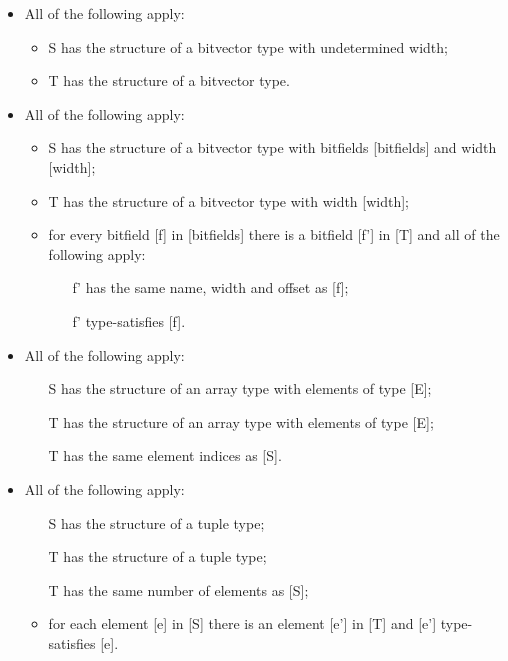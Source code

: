 \documentclass{book}
\begin{document}
\begin{itemize}
  \item  All of the following apply:
    \begin{itemize}
    \item  S has the structure of a bitvector type with undetermined width;
    \item  T has the structure of a bitvector type. 
    \end{itemize}

  \item  All of the following apply:
    \begin{itemize}
    \item  S has the structure of a bitvector type with bitfields [bitfields] and width [width];
    \item  T has the structure of a bitvector type with width [width];
    \item  for every bitfield [f] in [bitfields] there is a bitfield [f'] in [T] and
      all of the following apply:
      \begin{itemize}
      \item  [f'] has the same name, width and offset as [f];
      \item  [f'] type-satisfies [f].
      \end{itemize}
    \end{itemize}

  \item  All of the following apply:
    \begin{itemize}
    \item  [S] has the structure of an array type with elements of type [E];
    \item  [T] has the structure of an array type with elements of type [E];
    \item  [T] has the same element indices as [S].
    \end{itemize}

  \item  All of the following apply:
    \begin{itemize}
    \item  [S] has the structure of a tuple type;
    \item  [T] has the structure of a tuple type;
    \item  [T] has the same number of elements as [S];
    \item  for each element [e] in [S] there is an element [e'] in [T] and [e']
      type-satisfies [e].
    \end{itemize}  


\end{itemize}
\end{document}
